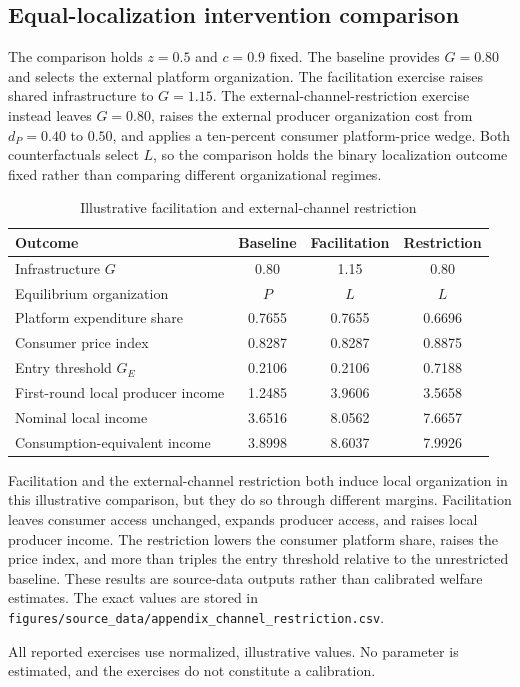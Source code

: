 \subsection{Equal-localization intervention comparison}

The comparison holds \(z=0.5\) and \(c=0.9\) fixed.  The baseline provides
\(G=0.80\) and selects the external platform organization.  The facilitation
exercise raises shared infrastructure to \(G=1.15\).  The
external-channel-restriction exercise instead leaves \(G=0.80\), raises the
external producer organization cost from \(d_P=0.40\) to \(0.50\), and
applies a ten-percent consumer platform-price wedge.  Both counterfactuals
select \(L\), so the comparison holds the binary localization outcome fixed
rather than comparing different organizational regimes.

\begin{table}[htbp]
\centering
\caption{Illustrative facilitation and external-channel restriction}
\label{tab:channel_restriction}
\begin{tabular}{lccc}
\toprule
Outcome & Baseline & Facilitation & Restriction\\
\midrule
Infrastructure \(G\) & 0.80 & 1.15 & 0.80\\
Equilibrium organization & \(P\) & \(L\) & \(L\)\\
Platform expenditure share & 0.7655 & 0.7655 & 0.6696\\
Consumer price index & 0.8287 & 0.8287 & 0.8875\\
Entry threshold \(G_E\) & 0.2106 & 0.2106 & 0.7188\\
First-round local producer income & 1.2485 & 3.9606 & 3.5658\\
Nominal local income & 3.6516 & 8.0562 & 7.6657\\
Consumption-equivalent income & 3.8998 & 8.6037 & 7.9926\\
\bottomrule
\end{tabular}
\end{table}

Facilitation and the external-channel restriction both induce local
organization in this
illustrative comparison, but they do so through different margins.
Facilitation leaves consumer access unchanged, expands producer access, and
raises local producer income.  The restriction lowers the consumer platform
share, raises the price index, and more than triples the entry threshold
relative to the unrestricted baseline.  These results are source-data outputs rather than
calibrated welfare estimates.  The exact values are stored in
\texttt{figures/source\_data/appendix\_channel\_restriction.csv}.

All reported exercises use normalized, illustrative values.  No parameter is
estimated, and the exercises do not constitute a calibration.
